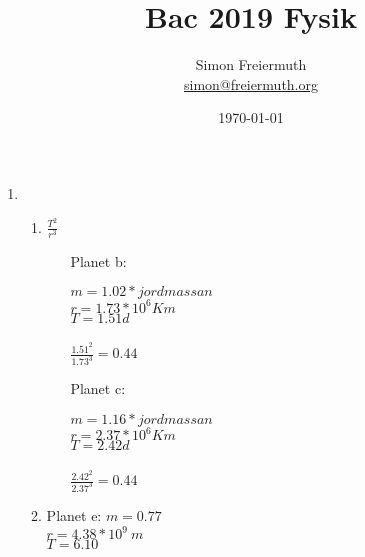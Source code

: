 \documentclass[12pt, letterpaper, twoside]{article}
\title{Bac 2019 Fysik}
\author{Simon Freiermuth \\ \href{mailto:simon@freiermuth.org}{simon@freiermuth.org}}
\date{\today}
\begin{document}
\maketitle

\begin{flushleft}

    \begin{enumerate}[label=\textbf{Del \Alph*}]
    \item
    \hfill

	\begin{enumerate}[label=\textbf{\alph*)}]
    	\item
	$\frac{T^2}{r^3}$

	\begin{itemize}
	    \item[Planet b:]

	    $m=1.02*jordmassan$\\
	    $r=1.73*10^6 Km$\\
	    $T=1.51 d$\\
	    \hfill\\
	    $\frac{1.51^2}{1.73^3}=0.44$

	    \hfill

	    \item[Planet c:]

	    $m=1.16*jordmassan$\\
	    $r=2.37*10^6 Km$\\
	    $T=2.42 d$\\
	    \hfill\\
	    $\frac{2.42^2}{2.37^3}=0.44$
	\end{itemize}

	\hfill
	\hfill

	\item
	Planet e:
	$m=0.77$\\
	$r=4.38*10^9\ m$\\
	$T=6.10$\\


\end{enumerate}
\end{enumerate}
\end{flushleft}
\end{document}
